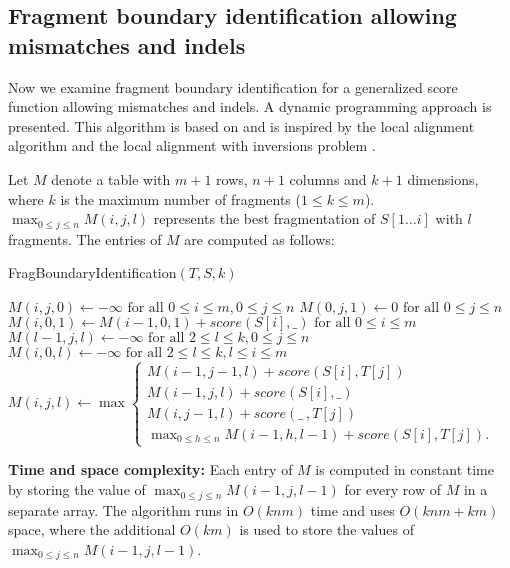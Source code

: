 \subsection{Fragment boundary identification allowing mismatches and indels}
Now we examine fragment boundary identification for a generalized score
function allowing mismatches and indels. A dynamic programming approach
is presented. This algorithm is based on and is inspired by the local
alignment algorithm \citep{smith1981identification} and the local
alignment with inversions problem \citep{schoniger1992local}.

Let $M$ denote a table with $m+1$ rows, $n+1$ columns and $k+1$
dimensions, where $k$ is the maximum number of fragments ($1 \leq k \leq
m$).  $\max_{0 \leq j \leq n}M(i,j,l)$ represents the best fragmentation
of $S[1 \dots i]$ with $l$ fragments. The entries of $M$ are computed as
follows:

\begin{algorithm}[H]
\caption{FragBoundaryIdentification$(T, S, k)$}
\begin{algorithmic}[1]
  \STATE $M(i,j,0) \leftarrow -\infty
          \text{ for all } 0 \leq i \leq m, 0 \leq j \leq n$
  \STATE $M(0,j,1) \leftarrow 0 \text{ for all } 0 \leq j \leq n$
  \STATE $M(i,0,1) \leftarrow M(i-1,0,1) + score(S[i], \_)
          \text{ for all } 0 \leq i \leq m$
  \STATE $M(l-1,j,l) \leftarrow -\infty \text{ for all } 2 \leq l \leq k,
          0 \leq j \leq n$
  \STATE $M(i,0,l) \leftarrow -\infty \text{ for all } 2 \leq l \leq k,
          l \leq i \leq m$
        \STATE $M(i,j,l) \leftarrow \max
          \begin{cases}
            M(i-1,j-1,l) + score(S[i], T[j]) \\
            M(i-1,j,l) + score(S[i], \_) \\
            M(i,j-1,l) + score(\_\ , T[j]) \\
            \max_{0 \leq h \leq n}M(i-1,h,l-1) + score(S[i], T[j]).
          \end{cases} $
      \ENDFOR
    \ENDFOR
  \ENDFOR
\end{algorithmic}
\label{gen_frag_id_alg}
\end{algorithm}

\noindent
\textbf{Time and space complexity:} Each entry of $M$ is computed in
constant time by storing the value of $\max_{0 \leq j \leq
n}M(i-1,j,l-1)$ for every row of $M$ in a separate array. The algorithm
runs in $O(knm)$ time and uses $O(knm + km)$ space, where the additional
$O(km)$ is used to store the values of $\max_{0 \leq j \leq
n}M(i-1,j,l-1)$.

